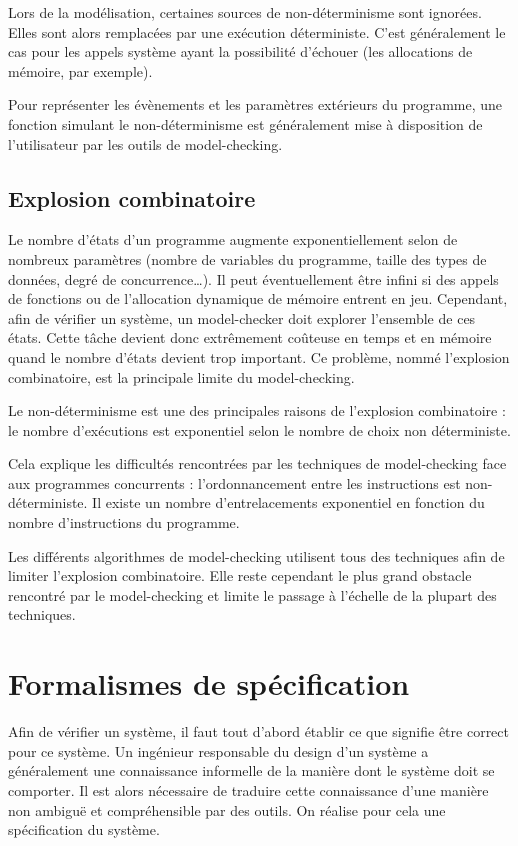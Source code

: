 Lors de la modélisation, certaines sources de non-déterminisme sont ignorées.
Elles sont alors remplacées par une exécution déterministe.
C'est généralement le cas pour les appels système ayant la possibilité
d'échouer (les allocations de mémoire, par exemple).

Pour représenter les évènements et les paramètres extérieurs du programme,
une fonction simulant le non-déterminisme est généralement mise à disposition
de l'utilisateur par les outils de model-checking.

\subsection{Explosion combinatoire}

Le nombre d'états d'un programme augmente exponentiellement selon de nombreux
paramètres (nombre de variables du programme, taille des types de données, degré
de concurrence\dots). Il peut éventuellement être infini si des appels de
fonctions ou de l'allocation dynamique de mémoire entrent en jeu. Cependant, afin
de vérifier un système, un model-checker doit explorer l'ensemble de ces états.
Cette tâche devient donc extrêmement coûteuse en temps et en mémoire quand le
nombre d'états devient trop important.
Ce problème, nommé l'explosion combinatoire, est la principale limite du
model-checking.

Le non-déterminisme est une des principales raisons de l'explosion combinatoire :
le nombre d'exécutions est exponentiel selon le nombre de choix non déterministe.

Cela explique les difficultés rencontrées par les techniques de model-checking
face aux programmes concurrents : l'ordonnancement entre les instructions est
non-déterministe. Il existe un nombre d'entrelacements exponentiel en fonction
du nombre d'instructions du programme.

Les différents algorithmes de model-checking utilisent tous des
techniques afin de limiter l'explosion combinatoire. Elle reste
cependant le plus grand obstacle rencontré par le model-checking et
limite le passage à l'échelle de la plupart des techniques.

\section{Formalismes de spécification}\label{sec:specification}

Afin de vérifier un système, il faut tout d'abord établir ce que signifie être
correct pour ce système. Un ingénieur responsable du design d'un système a
généralement une connaissance informelle de la manière dont le système doit se
comporter. Il est alors nécessaire de traduire cette connaissance d'une manière
non ambiguë et compréhensible par des outils. On réalise pour cela une
spécification du système.

